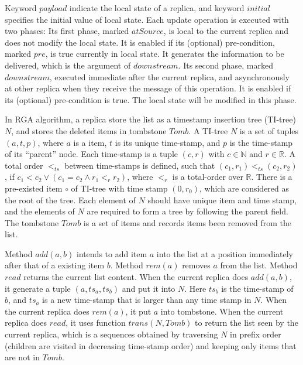 Keyword $\mathit{payload}$ indicate the local state of a replica, and keyword $\mathit{initial}$ specifies the initial value of local state. Each update operation is executed with two phases: Its first phase, marked $\mathit{atSource}$, is local to the current replica and does not modify the local state. It is enabled if its (optional) pre-condition, marked $\mathit{pre}$, is true currently in local state. It generates the information to be delivered, which is the argument of $\mathit{downstream}$. Its second phase, marked $\mathit{downstream}$, executed immediate after the current replica, and asynchronously at other replica when they receive the message of this operation. It is enabled if its (optional) pre-condition is true. The local state will be modified in this phase.

In RGA algorithm, a replica store the list as a timestamp insertion tree (TI-tree) $N$, and stores the deleted items in tombstone $\mathit{Tomb}$. A TI-tree $N$ is a set of tuples $(a,t,p)$, where $a$ is a item, $t$ is its unique time-stamp, and $p$ is the time-stamp of its ``parent'' node. Each time-stamp is a tuple $(c,r)$ with $c \in \mathbb{N}$ and $r \in \mathbb{R}$. A total order $<_{\mathit{ts}}$ between time-stamps is defined, such that $(c_1,r_1) <_{\mathit{ts}} (c_2,r_2)$, if $c_1 < c_2 \vee (c_1 = c_2 \wedge r_1 <_r r_2)$, where $<_r$ is a total-order over $\mathbb{R}$. There is a pre-existed item $\circ$ of TI-tree with time stamp $(0,r_0)$, which are considered as the root of the tree. Each element of $N$ should have unique item and time stamp, and the elements of $N$ are required to form a tree by following the parent field. The tombstone $\mathit{Tomb}$ is a set of items and records items been removed from the list.

Method $\mathit{add}(a,b)$ intends to add item $a$ into the list at a position immediately after that of a existing item $b$. Method $\mathit{rem}(a)$ removes $a$ from the list. Method $\mathit{read}$ returns the current list content. When the current replica does $\mathit{add}(a,b)$, it generate a tuple $(a,ts_a,ts_b)$ and put it into $N$. Here $ts_b$ is the time-stamp of $b$, and $ts_a$ is a new time-stamp that is larger than any time stamp in $N$. When the current replica does $\mathit{rem}(a)$, it put $a$ into tombstone. When the current replica does $\mathit{read}$, it uses function $\mathit{trans}(N,\mathit{Tomb})$ to return the list seen by the current replica, which is a sequences obtained by traversing $N$ in prefix order (children are visited in decreasing time-stamp order) and keeping only items that are not in $\mathit{Tomb}$.

